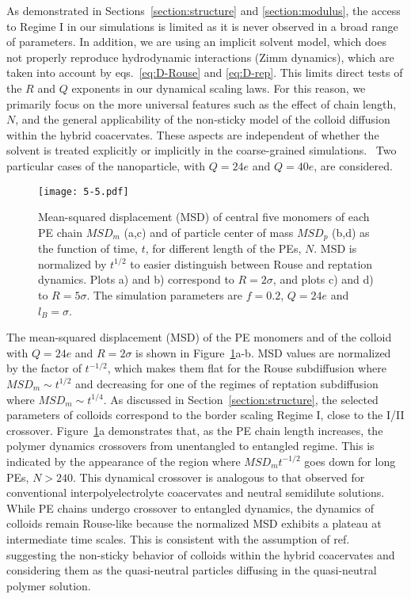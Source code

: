 \documentclass[journal=mamobx, manuscript=article]{achemso}
\begin{document}
As demonstrated in Sections~\ref{section:structure} and \ref{section:modulus}, the access to Regime I in our simulations is limited as it is never observed in a broad range of parameters. In addition, we are using an implicit solvent model, which does not properly reproduce hydrodynamic interactions (Zimm dynamics), which are taken into account by eqs.~\ref{eq:D-Rouse} and \ref{eq:D-rep}. This limits direct tests of the $R$ and $Q$ exponents in our dynamical scaling laws. For this reason, we primarily focus on the more universal features such as the effect of chain length, $N$, and the general applicability of the non-sticky model of the colloid diffusion within the hybrid coacervates. These aspects are independent of whether the solvent is treated explicitly or implicitly in the coarse-grained simulations.~\cite{yu2020crossover} Two particular cases of the nanoparticle, with $Q = 24e$ and $Q = 40e$, are considered.   


\begin{figure}[ht]
\centering
\texttt{[image: 5-5.pdf]}
\caption{Mean-squared displacement (MSD) of central five monomers of each PE chain $MSD_{m}$ (a,c) and of particle center of mass $MSD_{p}$ (b,d) as the function of time, $t$, for different length of the PEs, $N$. MSD is normalized by $t^{1/2}$ to easier distinguish between Rouse and reptation dynamics. Plots a) and b) correspond to $R = 2 \sigma$, and plots c) and d) to $R = 5 \sigma$.  The simulation parameters are $f = 0.2$, $Q = 24e$ and $l_{B} = \sigma$.}
\label{fig:dynamicsq24}
\end{figure}

The mean-squared displacement (MSD) of the PE monomers and of the colloid with $Q = 24e$ and $R = 2 \sigma$ is shown in Figure~\ref{fig:dynamicsq24}a-b. MSD values are normalized by the factor of $t^{-1/2}$, which makes them flat for the Rouse subdiffusion where $MSD_{m} \sim t^{1/2}$ and decreasing for one of the regimes of reptation subdiffusion where $MSD_{m} \sim t^{1/4}$. As discussed in Section~\ref{section:structure}, the selected parameters of colloids correspond to the border scaling Regime I, close to the I/II crossover. Figure~\ref{fig:dynamicsq24}a demonstrates that, as the PE chain length increases, the polymer dynamics crossovers from unentangled to entangled regime. This is indicated by the appearance of the region where $MSD_{m} t^{-1/2}$ goes down for long PEs, $N > 240$. This dynamical crossover is analogous to that observed for conventional interpolyelectrolyte coacervates and neutral semidilute solutions.~\cite{yu2020crossover}
While PE chains undergo crossover to entangled dynamics, the dynamics of colloids remain Rouse-like because the normalized MSD exhibits a plateau at intermediate time scales. This is consistent with the assumption of ref.~ suggesting the non-sticky behavior of colloids within the hybrid coacervates and considering them as the quasi-neutral particles diffusing in the quasi-neutral polymer solution.~\cite{cai2011mobility}  
\end{document}
